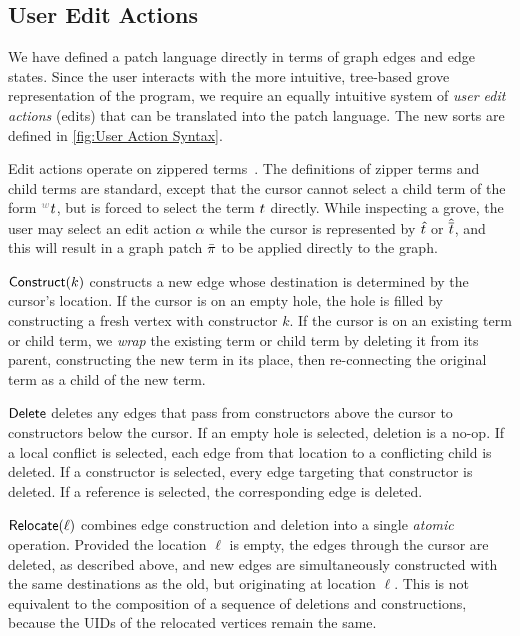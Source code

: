 \figureUserActionSyntax

\subsection{User Edit Actions}%
\label{sub:User Actions}

We have defined a patch language directly in terms of graph edges and edge states. Since the user interacts with the more intuitive, tree-based grove representation of the program, we require an equally intuitive system of \textit{user edit actions} (edits) that can be translated into the patch language. The new sorts are defined in \autoref{fig:User Action Syntax}.

Edit actions operate on zippered terms~\cite{DBLP:journals/jfp/Huet97,DBLP:conf/popl/OmarVHAH17}. The definitions of zipper terms and child terms are standard, except that the cursor cannot select a child term of the form $\eid{w}{}\termMV$, but is forced to select the term $t$ directly. While inspecting a grove, the user may select an edit action $\alpha$ while the cursor is represented by $\hat{t}$ or $\hat{\overline{t}}$, and this will result in a graph patch $\bar{\pi}$ to be applied directly to the  graph.

$\mathsf{Construct}\mathopen{}\left(k\right)\mathclose{}$ constructs a new edge whose destination is determined by the cursor's location. If the cursor is on an empty hole, the hole is filled by constructing a fresh vertex with constructor $k$. If the cursor is on an existing term or child term, we \emph{wrap} the existing term or child term by deleting it from its parent, constructing the new term in its place, then re-connecting the original term as a child of the new term.

$\mathsf{Delete}$ deletes any edges that pass from constructors above the cursor to constructors below the cursor. If an empty hole is selected, deletion is a no-op. If a local conflict is selected, each edge from that location to a conflicting child is deleted. If a constructor is selected, every edge targeting that constructor is deleted. If a reference is selected, the corresponding edge is deleted. 

$\mathsf{Relocate}\mathopen{}\left(\ell\right)\mathclose{}$ combines edge construction and deletion into a single \emph{atomic} operation. Provided the location $\ell$ is empty, the edges through the cursor are deleted, as described above, and new edges are simultaneously constructed with the same destinations as the old, but originating at location $\ell$. This is not equivalent to the composition of a sequence of deletions and constructions, because the UIDs of the relocated vertices remain the same. 

